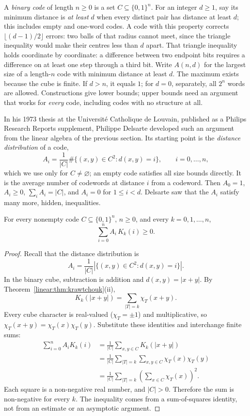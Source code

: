 A \emph{binary code} of length $n\ge0$ is a set $C\subseteq\{0,1\}^n$.
For an integer $d\ge1$, say its minimum distance is \emph{at least} $d$
when every distinct pair has distance at least $d$; this includes empty and
one-word codes. A code with this property corrects
$\lfloor(d-1)/2\rfloor$ errors: two balls of that radius cannot meet, since
the triangle inequality would make their centres less than $d$ apart.
That triangle inequality holds coordinate by coordinate: a difference between
two endpoint bits requires a difference on at least one step through a third bit.
Write $A(n,d)$ for the largest size of a length-$n$ code with minimum distance
at least $d$. The maximum exists because the cube is finite. If $d>n$, it
equals $1$; for $d=0$, separately, all $2^n$ words are allowed.
Constructions give lower bounds; upper bounds need an argument that works for \emph{every} code, including
codes with no structure at all.

In his 1973 thesis at the Universit\'e Catholique de Louvain, published as a
Philips Research Reports supplement, Philippe Delsarte developed such an
argument from the linear algebra of the previous section. Its starting point is the \emph{distance distribution} of a code,
\[
A_i=\frac1{|C|}\#\{(x,y)\in C^2:d(x,y)=i\},\qquad i=0,\dots,n,
\]
which we use only for $C\ne\varnothing$; an empty code satisfies all size bounds
directly. It is the average number of codewords at distance $i$ from a codeword.
Then $A_0=1$, $A_i\ge0$, $\sum_iA_i=|C|$, and $A_i=0$ for
$1\le i<d$. Delsarte saw that the $A_i$ satisfy many more, hidden, inequalities.

\begin{theorem}[Delsarte, 1973]\label{linear:thm:delsarte}
For every nonempty code $C\subseteq\{0,1\}^n$, $n\ge0$, and every $k=0,1,\dots,n$,
\[
\sum_{i=0}^nA_i\,K_k(i)\ge0.
\]
\end{theorem}
\begin{proof}
Recall that the distance distribution is
\[
A_i=\frac1{|C|}
  |\{(x,y)\in C^2:d(x,y)=i\}|.
\]
In the binary cube, subtraction is addition
and $d(x,y)=|x+y|$. By
Theorem~\ref{linear:thm:krawtchouk}(ii),
\[
K_k(|x+y|)
=\sum_{|T|=k}\chi_T(x+y).
\]
Every cube character is real-valued
($\chi_T=\pm1$) and multiplicative,
so $\chi_T(x+y)=\chi_T(x)\chi_T(y)$.
Substitute these identities and
interchange finite sums:
\[
\begin{aligned}
\sum_{i=0}^nA_iK_k(i)
&=\frac1{|C|}\sum_{x,y\in C}K_k(|x+y|)\\
&=\frac1{|C|}\sum_{|T|=k}
   \sum_{x,y\in C}\chi_T(x)\chi_T(y)\\
&=\frac1{|C|}\sum_{|T|=k}
   \left(\sum_{x\in C}\chi_T(x)\right)^2.
\end{aligned}
\]
Each square is a non-negative real
number, and $|C|>0$. Therefore the
sum is non-negative for every $k$.
The inequality comes from a
sum-of-squares identity, not from
an estimate or an asymptotic argument.
\end{proof}

